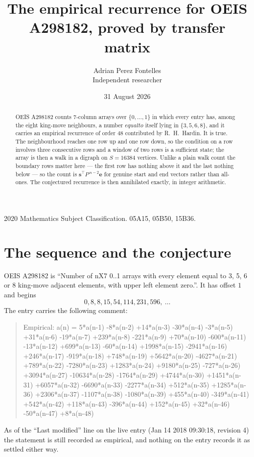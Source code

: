 \documentclass[11pt,a4paper]{article}
\title{The empirical recurrence for OEIS A298182, proved by transfer matrix}
\author{Adrian Perez Fontelles\\ \small Independent researcher}
\date{31 August 2026}
\theoremstyle{plain}
\theoremstyle{definition}
\begin{document}
\maketitle

\begin{abstract}
OEIS A298182 counts $7$-column arrays over $\{0,\dots,1\}$ in which every entry has,
among the eight king-move neighbours, a number $equal to$ itself lying in $\{3,5,6,8\}$, and it carries an empirical
recurrence of order $48$ contributed by R.~H.~Hardin. It is true. The neighbourhood
reaches one row up and one row down, so the condition on a row involves three consecutive
rows and a window of two rows is a sufficient state; the array is then a walk in a digraph
on $S=16384$ vertices. Unlike a plain walk count the boundary rows matter here --- the first
row has nothing above it and the last nothing below --- so the count is
$\mathbf{s}^{\!\top}P^{\,n-2}\mathbf{e}$ for genuine start and end vectors rather than
all-ones. The conjectured recurrence is then annihilated exactly, in integer arithmetic.
\end{abstract}

\noindent\small 2020 Mathematics Subject Classification. 05A15, 05B50, 15B36.\normalsize

\section{The sequence and the conjecture}

OEIS A298182 is ``Number of nX7 0..1 arrays with every element equal to 3, 5, 6 or 8 king-move adjacent elements, with upper left element zero.''. It has offset
$1$ and begins
\[
0, 8, 8, 15, 54, 114, 231, 596,\ \dots
\]
The entry carries the following comment:
\begin{quote}\small
Empirical: a(n) = 5*a(n-1) -8*a(n-2) +14*a(n-3) -30*a(n-4) -3*a(n-5) +31*a(n-6) -19*a(n-7) +239*a(n-8) -221*a(n-9) +70*a(n-10) -600*a(n-11) -13*a(n-12) +699*a(n-13) -60*a(n-14) +1998*a(n-15) -2941*a(n-16) +246*a(n-17) -919*a(n-18) +748*a(n-19) +5642*a(n-20) -4627*a(n-21) +789*a(n-22) -7280*a(n-23) +1283*a(n-24) +9180*a(n-25) -727*a(n-26) +3094*a(n-27) -10634*a(n-28) -1764*a(n-29) +4744*a(n-30) +1451*a(n-31) +6057*a(n-32) -6690*a(n-33) -2277*a(n-34) +512*a(n-35) +1285*a(n-36) +2306*a(n-37) -1107*a(n-38) -1080*a(n-39) +455*a(n-40) -349*a(n-41) +542*a(n-42) +118*a(n-43) -396*a(n-44) +152*a(n-45) +32*a(n-46) -50*a(n-47) +8*a(n-48)
\end{quote}
As of the ``Last modified'' line on the live entry (Jan 14 2018 09:30:18, revision
4) the statement is still recorded as empirical, and nothing on the entry
records it as settled either way.
\end{document}
